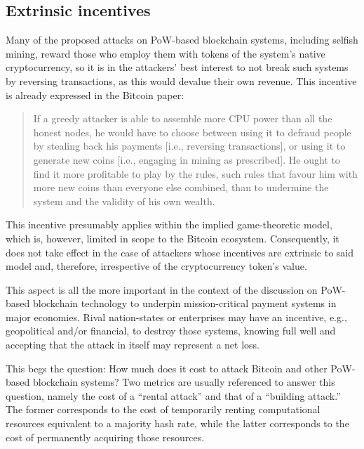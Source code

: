 \subsection{Extrinsic incentives}

Many of the proposed attacks on PoW-based blockchain systems, including selfish mining, reward those who employ them with tokens of the system's native cryptocurrency, so it is in the attackers' best interest to not break such systems by reversing transactions, as this would devalue their own revenue.
This incentive is already expressed in the Bitcoin paper: \autocite[4]{nakamoto2008}

\begin{quote}
If a greedy attacker is able to assemble more CPU power than all the honest nodes, he would have to choose between using it to defraud people by stealing back his payments [i.e., reversing transactions], or using it to generate new coins [i.e., engaging in mining as prescribed].
He ought to find it more profitable to play by the rules, such rules that favour him with more new coins than everyone else combined, than to undermine the system and the validity of his own wealth.
\end{quote}

This incentive presumably applies within the implied game-theoretic model, which is, however, limited in scope to the Bitcoin ecosystem.
Consequently, it does not take effect in the case of attackers whose incentives are extrinsic to said model and, therefore, irrespective of the cryptocurrency token's value.

This aspect is all the more important in the context of the discussion on PoW-based blockchain technology to underpin mission-critical payment systems in major economies.
Rival nation-states or enterprises may have an incentive, e.g., geopolitical and/or financial, to destroy those systems, knowing full well and accepting that the attack in itself may represent a net loss.

This begs the question:
How much does it cost to attack Bitcoin and other PoW-based blockchain systems?
Two metrics are usually referenced to answer this question, namely the cost of a ``rental attack'' and that of a ``building attack.''
The former corresponds to the cost of temporarily renting computational resources equivalent to a majority hash rate, while the latter corresponds to the cost of permanently acquiring those resources.

